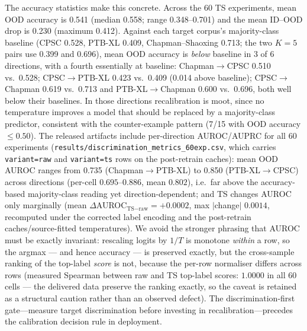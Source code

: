 \documentclass[review,12pt,nonatbib]{elsarticle}
\begin{document}
The accuracy statistics make this concrete. Across the 60 TS
experiments, mean OOD accuracy is 0.541 (median 0.558; range
0.348--0.701) and the mean ID--OOD drop is 0.230 (maximum 0.412).
Against each target corpus's majority-class baseline (CPSC 0.528,
PTB-XL 0.409, Chapman--Shaoxing 0.713; the two $K{=}5$ pairs use
0.399 and 0.696), mean OOD accuracy is
\emph{below} baseline in 3 of 6 directions, with a fourth essentially
at baseline: Chapman$\rightarrow$CPSC
0.510 vs.\ 0.528; CPSC$\rightarrow$PTB-XL 0.423 vs.\ 0.409 (0.014
above baseline); CPSC$\rightarrow$Chapman 0.619 vs.\ 0.713 and
PTB-XL$\rightarrow$Chapman 0.600 vs.\ 0.696, both well below their
baselines. In those
directions recalibration is moot, since no temperature improves a model that
should be replaced by a majority-class predictor, consistent with
the counter-example pattern (7/15 with OOD accuracy $\leq 0.50$).
The released artifacts include per-direction AUROC/AUPRC for all 60
experiments (\texttt{results/discrimination\_metrics\_60exp.csv},
which carries \texttt{variant=raw} and \texttt{variant=ts} rows on the
post-retrain caches):
mean OOD
AUROC ranges from 0.735 (Chapman$\rightarrow$PTB-XL) to 0.850
(PTB-XL$\rightarrow$CPSC) across directions (per-cell $0.695$--$0.886$,
mean $0.802$), i.e.\ far above the accuracy-based
majority-class reading yet direction-dependent; and TS changes AUROC only
marginally (mean $\Delta$AUROC$_{\text{TS}-\text{raw}} = +0.0002$, max
$|$change$|$ $0.0014$, recomputed under the corrected label encoding and
the post-retrain caches/source-fitted temperatures). We
avoid the stronger phrasing that AUROC must be exactly invariant:
rescaling logits by $1/T$ is monotone \emph{within} a row, so the argmax
--- and hence accuracy --- is preserved exactly, but the cross-sample
ranking of the top-label \emph{score} is not, because the per-row
normaliser differs across rows (measured Spearman between raw and TS
top-label scores: $1.0000$ in all 60 cells --- the delivered data
preserve the ranking exactly, so the caveat is retained as a structural
caution rather than an observed defect). The discrimination-first
gate---measure target discrimination before investing in
recalibration---precedes the calibration decision rule in
deployment.
\end{document}
